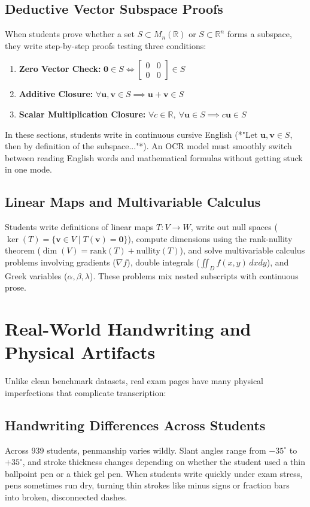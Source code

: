 \subsection{Deductive Vector Subspace Proofs}
When students prove whether a set $S \subset M_n(\mathbb{R})$ or $S \subset \mathbb{R}^n$ forms a subspace, they write step-by-step proofs testing three conditions:
\begin{enumerate}
    \item \textbf{Zero Vector Check:} $\mathbf{0} \in S \iff \begin{bmatrix} 0 & 0 \\ 0 & 0 \end{bmatrix} \in S$
    \item \textbf{Additive Closure:} $\forall \mathbf{u}, \mathbf{v} \in S \implies \mathbf{u} + \mathbf{v} \in S$
    \item \textbf{Scalar Multiplication Closure:} $\forall c \in \mathbb{R}, \ \forall \mathbf{u} \in S \implies c\mathbf{u} \in S$
\end{enumerate}
In these sections, students write in continuous cursive English (*"Let $\mathbf{u}, \mathbf{v} \in S$, then by definition of the subspace..."*). An OCR model must smoothly switch between reading English words and mathematical formulas without getting stuck in one mode.

\subsection{Linear Maps and Multivariable Calculus}
Students write definitions of linear maps $T: V \to W$, write out null spaces ($\ker(T) = \{ \mathbf{v} \in V \mid T(\mathbf{v}) = \mathbf{0} \}$), compute dimensions using the rank-nullity theorem ($\dim(V) = \text{rank}(T) + \text{nullity}(T)$), and solve multivariable calculus problems involving gradients ($\nabla f$), double integrals ($\iint_D f(x, y) \, dx dy$), and Greek variables ($\alpha, \beta, \lambda$). These problems mix nested subscripts with continuous prose.

\section{Real-World Handwriting and Physical Artifacts}
\label{sec:degradation_challenges}

Unlike clean benchmark datasets, real exam pages have many physical imperfections that complicate transcription:

\subsection{Handwriting Differences Across Students}
Across 939 students, penmanship varies wildly. Slant angles range from $-35^\circ$ to $+35^\circ$, and stroke thickness changes depending on whether the student used a thin ballpoint pen or a thick gel pen. When students write quickly under exam stress, pens sometimes run dry, turning thin strokes like minus signs or fraction bars into broken, disconnected dashes.

